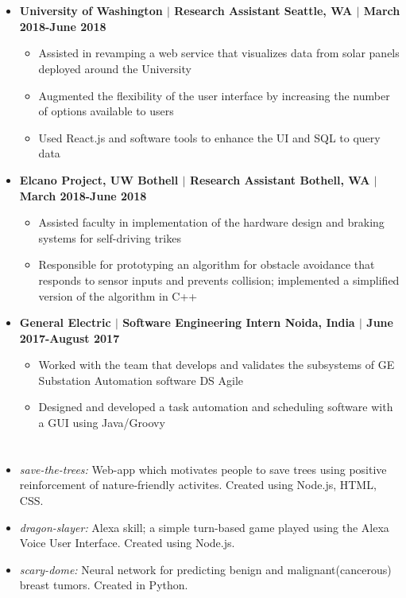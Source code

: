 \documentclass[10pt]{article}
\newcommand{\work}[4]{\textbf{#1 $|$ #2 \hfill #3 $|$ #4}}
\begin{document}
\begin{spacing}{0.3}
\section*{\color{crimson}{Relevant Experience}}
\begin{itemize}
\setlength\itemsep{0.1em}
    \item \work{University of Washington}{Research Assistant}{Seattle, WA}{March 2018-June 2018}
    \begin{itemize}
        \item Assisted in revamping a web service that visualizes data from solar panels deployed around the University
        \item Augmented the flexibility of the user interface by increasing the number of options available to users
        \item Used React.js and software tools to enhance the UI and SQL to query data
    \end{itemize}
    \item \work{Elcano Project, UW Bothell}{Research Assistant}{Bothell, WA}{March 2018-June 2018}
    \begin{itemize}
        \item Assisted faculty in implementation of the hardware design and braking systems for self-driving trikes
        \item Responsible for prototyping an algorithm for obstacle avoidance that responds to sensor inputs and prevents collision; implemented a simplified version of the algorithm in C++
    \end{itemize}
    \item \work{General Electric}{Software Engineering Intern}{Noida, India}{June 2017-August 2017}
    \begin{itemize}
        \item Worked with the team that develops and validates the subsystems of GE Substation Automation software DS Agile
        \item Designed and developed a task automation and scheduling software with a GUI using Java/Groovy
    \end{itemize}
\end{itemize}
\section*{\color{crimson}{Personal Projects}}
\begin{itemize}
\setlength\itemsep{0.1em}
    \item \emph{save-the-trees:} Web-app which motivates people to save trees using positive reinforcement of nature-friendly activites. Created using Node.js, HTML, CSS.
    \item \emph{dragon-slayer:} Alexa skill; a simple turn-based game played using the Alexa Voice User Interface. Created using Node.js.
    \item \emph{scary-dome:} Neural network for predicting benign and malignant(cancerous) breast tumors. Created in Python.
\end{itemize}

\end{spacing}
\end{document}
